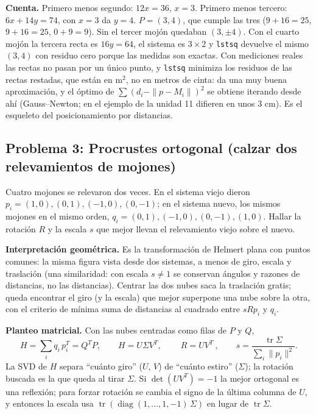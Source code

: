 \textbf{Cuenta.} Primero menos segundo: \(12x=36\), \(x=3\). Primero menos tercero:
\(6x+14y=74\), con \(x=3\) da \(y=4\). \(P=(3,4)\), que cumple las tres
(\(9+16=25\), \(9+16=25\), \(0+9=9\)). Sin el tercer mojón quedaban \((3,\pm4)\). Con el
cuarto mojón la tercera recta es \(16y=64\), el sistema es \(3\times2\) y
\texttt{lstsq} devuelve el mismo \((3,4)\) con residuo cero porque las medidas son
exactas. Con mediciones reales las rectas no pasan por un único punto, y \texttt{lstsq}
minimiza los residuos de las rectas restadas, que están en m\(^2\), no en metros de
cinta: da una muy buena aproximación, y el óptimo de \(\sum(d_i-\|p-M_i\|)^2\) se obtiene
iterando desde ahí (Gauss--Newton; en el ejemplo de la unidad 11 difieren en unos
\(3\) cm). Es el esqueleto del posicionamiento por distancias.

\subsection{Problema 3: Procrustes ortogonal (calzar dos relevamientos de mojones)}

\begin{enunciado}[Enunciado]
Cuatro mojones se relevaron dos veces. En el sistema viejo dieron
\(p_i=(1,0),(0,1),(-1,0),(0,-1)\); en el sistema nuevo, los mismos mojones en el mismo
orden, \(q_i=(0,1),(-1,0),(0,-1),(1,0)\). Hallar la rotación \(R\) y la escala \(s\) que
mejor llevan el relevamiento viejo sobre el nuevo.
\end{enunciado}

\textbf{Interpretación geométrica.} Es la transformación de Helmert plana con puntos
comunes: la misma figura vista desde dos sistemas, a menos de giro, escala y traslación (una
similaridad: con escala \(s\neq1\) se conservan ángulos y razones de distancias, no las
distancias). Centrar las dos nubes saca la
traslación gratis; queda encontrar el giro (y la escala) que mejor superpone una nube
sobre la otra, con el criterio de mínima suma de distancias al cuadrado entre
\(sRp_i\) y \(q_i\).

\textbf{Planteo matricial.} Con las nubes centradas como filas de \(P\) y \(Q\),
\[
  H=\sum_i q_i\,p_i^T=Q^TP,\qquad H=U\Sigma V^T,\qquad \boxed{\ R=UV^T\ },\qquad
  s=\frac{\operatorname{tr}\Sigma}{\sum_i\|p_i\|^2}.
\]
La SVD de \(H\) separa ``cuánto giro'' (\(U\), \(V\)) de ``cuánto estiro'' (\(\Sigma\));
la rotación buscada es la que queda al tirar \(\Sigma\). Si \(\det(UV^T)=-1\) la mejor
ortogonal es una reflexión; para forzar rotación se cambia el signo de la última columna
de \(U\), y entonces la escala usa \(\operatorname{tr}(\operatorname{diag}(1,\dots,1,-1)\,\Sigma)\)
en lugar de \(\operatorname{tr}\Sigma\).

